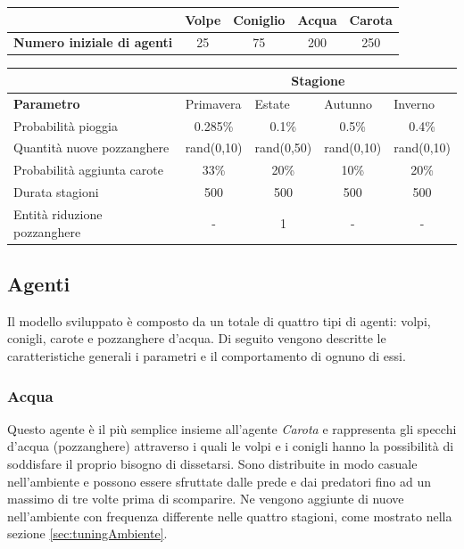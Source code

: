 \documentclass[11pt]{article}
\begin{document}
\begin{table}[h!]
\centering
{\renewcommand\arraystretch{1.9}
\begin{tabular}{l|cccc}
& \textbf{Volpe} & \textbf{Coniglio} & \textbf{Acqua} & \textbf{Carota} \\ \hline
\textbf{Numero iniziale di agenti} & 25    & 75       & 200   & 250   
\end{tabular}}
\end{table}

\begin{table}[h!]
\centering
{\renewcommand\arraystretch{1.6}
\begin{tabular}{p{}|cccc}
& \multicolumn{4}{c}{\textbf{Stagione}} \\   
\hline
\textbf{Parametro} & \multicolumn{1}{l}{Primavera} & \multicolumn {1}{l}{Estate} & \multicolumn{1}{l}{Autunno} & \multicolumn{1}{l}{Inverno} \\
\hline
Probabilità pioggia  & 0.285\%  & 0.1\%  & 0.5\% & 0.4\% \\
Quantità nuove pozzanghere & rand(0,10) & rand(0,50) & rand(0,10) & rand(0,10) \\
Probabilità aggiunta carote & 33\% & 20\% & 10\% & 20\% \\
Durata stagioni & 500 & 500 & 500 & 500 \\
Entità riduzione pozzanghere & -  & 1  & - & -    
\end{tabular}}
\end{table}

\subsection{Agenti}
Il modello sviluppato è composto da un totale di quattro tipi di agenti: volpi, conigli, carote e pozzanghere d'acqua. Di seguito vengono descritte le caratteristiche generali i parametri e il comportamento di ognuno di essi. 

\subsubsection{Acqua}
Questo agente è il più semplice insieme all'agente \emph{Carota} e rappresenta gli specchi d'acqua (pozzanghere) attraverso i quali le volpi e i conigli hanno la possibilità di soddisfare il proprio bisogno di dissetarsi. Sono distribuite in modo casuale nell'ambiente e possono essere sfruttate dalle prede e dai predatori fino ad un massimo di tre volte prima di scomparire. Ne vengono aggiunte di nuove nell'ambiente con frequenza differente nelle quattro stagioni, come mostrato nella sezione \ref{sec:tuningAmbiente}.  
\end{document}
